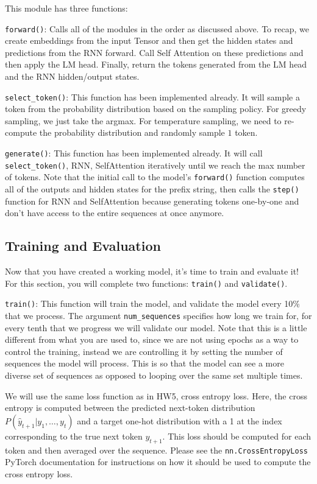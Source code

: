 \documentclass[11pt,addpoints,answers]{exam}
\begin{document}
This module has three functions:

\texttt{forward()}: Calls all of the modules in the order as discussed above. To recap, we create embeddings from the input Tensor and then get the hidden states and predictions from the RNN forward. Call Self Attention on these predictions and then apply the LM head. Finally, return the tokens generated from the LM head and the RNN hidden/output states.

\texttt{select\_token()}: This function has been implemented already. It will sample a token from the probability distribution based on the sampling policy. For greedy sampling, we just take the argmax. For temperature sampling, we need to re-compute the probability distribution and randomly sample $1$ token.

\texttt{generate()}: This function has been implemented already. It will call \texttt{select\_token()}, RNN, SelfAttention iteratively until we reach the max number of tokens. Note that the initial call to the model's \texttt{forward()} function computes all of the outputs and hidden states for the prefix string, then calls the \texttt{step()} function for RNN and SelfAttention because generating tokens one-by-one and don't have access to the entire sequences at once anymore.


\subsection{Training and Evaluation}\label{train_and_eval}

Now that you have created a working model, it's time to train and evaluate it! For this section, you will complete two functions: \texttt{train()} and \texttt{validate()}.

\texttt{train()}: This function will train the model, and validate the model every 10\% that we process. The argument \texttt{num\_sequences} specifies how long we train for, for every tenth that we progress we will validate our model. Note that this is a little different from what you are used to, since we are not using epochs as a way to control the training, instead we are controlling it by setting the number of sequences the model will process. This is so that the model can see a more diverse set of sequences as opposed to looping over the same set multiple times.

We will use the same loss function as in HW5, cross entropy loss. Here, the cross entropy is computed between the predicted next-token distribution $P(\hat{y}_{t+1}|y_1, \ldots, y_t)$ and a target one-hot distribution with a 1 at the index corresponding to the true next token $y_{t+1}$. This loss should be computed for each token and then averaged over the sequence. Please see the \texttt{nn.CrossEntropyLoss} PyTorch documentation for instructions on how it should be used to compute the cross entropy loss.
\end{document}
